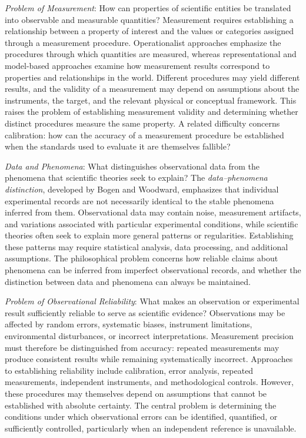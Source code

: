 \emph{Problem of Measurement}: How can properties of scientific entities be translated into observable and measurable quantities? Measurement requires establishing a relationship between a property of interest and the values or categories assigned through a measurement procedure. Operationalist approaches emphasize the procedures through which quantities are measured, whereas representational and model-based approaches examine how measurement results correspond to properties and relationships in the world. Different procedures may yield different results, and the validity of a measurement may depend on assumptions about the instruments, the target, and the relevant physical or conceptual framework. This raises the problem of establishing measurement validity and determining whether distinct procedures measure the same property. A related difficulty concerns calibration: how can the accuracy of a measurement procedure be established when the standards used to evaluate it are themselves fallible?

\emph{Data and Phenomena}: What distinguishes observational data from the phenomena that scientific theories seek to explain? The \emph{data--phenomena distinction}, developed by Bogen and Woodward, emphasizes that individual experimental records are not necessarily identical to the stable phenomena inferred from them. Observational data may contain noise, measurement artifacts, and variations associated with particular experimental conditions, while scientific theories often seek to explain more general patterns or regularities. Establishing these patterns may require statistical analysis, data processing, and additional assumptions. The philosophical problem concerns how reliable claims about phenomena can be inferred from imperfect observational records, and whether the distinction between data and phenomena can always be maintained.

\emph{Problem of Observational Reliability}: What makes an observation or experimental result sufficiently reliable to serve as scientific evidence? Observations may be affected by random errors, systematic biases, instrument limitations, environmental disturbances, or incorrect interpretations. Measurement precision must therefore be distinguished from accuracy: repeated measurements may produce consistent results while remaining systematically incorrect. Approaches to establishing reliability include calibration, error analysis, repeated measurements, independent instruments, and methodological controls. However, these procedures may themselves depend on assumptions that cannot be established with absolute certainty. The central problem is determining the conditions under which observational errors can be identified, quantified, or sufficiently controlled, particularly when an independent reference is unavailable.

